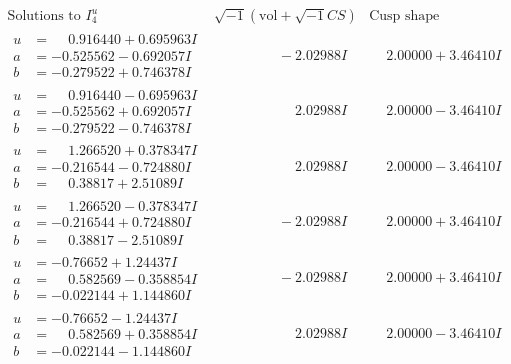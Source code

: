 \documentclass[1p]{elsarticle_modified}
\theoremstyle{definition}
\newcommand{\I}{\sqrt{-1}}
\begin{document}
$$\begin{array}{c|c|c}  
\text{Solutions to }I^u_{4}& \I (\text{vol} + \sqrt{-1}CS) & \text{Cusp shape}\\
 \hline 
\begin{aligned}
u &= \phantom{-}0.916440 + 0.695963 I \\
a &= -0.525562 - 0.692057 I \\
b &= -0.279522 + 0.746378 I\end{aligned}
 & \phantom{-0.000000 } -2.02988 I & \phantom{-}2.00000 + 3.46410 I \\ \hline\begin{aligned}
u &= \phantom{-}0.916440 - 0.695963 I \\
a &= -0.525562 + 0.692057 I \\
b &= -0.279522 - 0.746378 I\end{aligned}
 & \phantom{-0.000000 -}2.02988 I & \phantom{-}2.00000 - 3.46410 I \\ \hline\begin{aligned}
u &= \phantom{-}1.266520 + 0.378347 I \\
a &= -0.216544 - 0.724880 I \\
b &= \phantom{-}0.38817 + 2.51089 I\end{aligned}
 & \phantom{-0.000000 -}2.02988 I & \phantom{-}2.00000 - 3.46410 I \\ \hline\begin{aligned}
u &= \phantom{-}1.266520 - 0.378347 I \\
a &= -0.216544 + 0.724880 I \\
b &= \phantom{-}0.38817 - 2.51089 I\end{aligned}
 & \phantom{-0.000000 } -2.02988 I & \phantom{-}2.00000 + 3.46410 I \\ \hline\begin{aligned}
u &= -0.76652 + 1.24437 I \\
a &= \phantom{-}0.582569 - 0.358854 I \\
b &= -0.022144 + 1.144860 I\end{aligned}
 & \phantom{-0.000000 } -2.02988 I & \phantom{-}2.00000 + 3.46410 I \\ \hline\begin{aligned}
u &= -0.76652 - 1.24437 I \\
a &= \phantom{-}0.582569 + 0.358854 I \\
b &= -0.022144 - 1.144860 I\end{aligned}
 & \phantom{-0.000000 -}2.02988 I & \phantom{-}2.00000 - 3.46410 I \\ \hline\begin{aligned}

\end{aligned}
\end{array}$$
\end{document}
